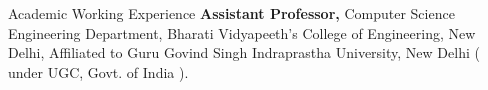 \begin{rubric}{Academic Working Experience}
%
	\textbf{Assistant Professor,} Computer Science Engineering Department, Bharati Vidyapeeth's College of Engineering, New Delhi, Affiliated to Guru Govind Singh Indraprastha University, New Delhi ( under UGC, Govt. of India ).
%
%

%
\end{rubric}
